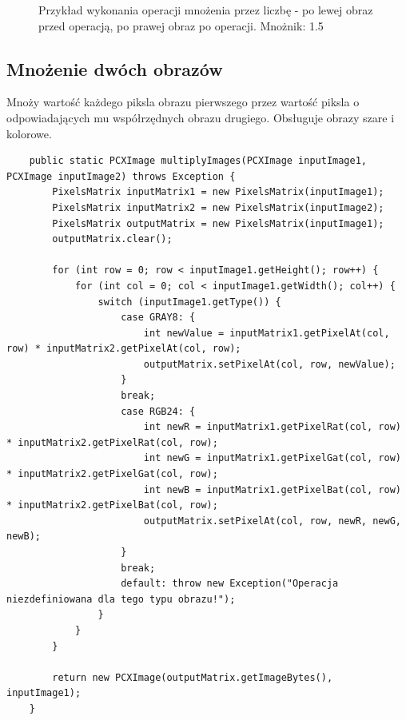 \documentclass{article}
\begin{document}
\begin{figure}[!ht]
	\caption{Przykład wykonania operacji mnożenia przez liczbę - po lewej obraz przed operacją, po prawej obraz po operacji. Mnożnik: 1.5 }
	\label{fig3}	
	\end{figure}
	
	\subsection{Mnożenie dwóch obrazów}
	Mnoży wartość każdego piksla obrazu pierwszego przez wartość piksla o odpowiadających mu współrzędnych obrazu drugiego. Obsługuje obrazy szare i kolorowe.
	
	\begin{verbatim}
	public static PCXImage multiplyImages(PCXImage inputImage1, PCXImage inputImage2) throws Exception {
        PixelsMatrix inputMatrix1 = new PixelsMatrix(inputImage1);
        PixelsMatrix inputMatrix2 = new PixelsMatrix(inputImage2);
        PixelsMatrix outputMatrix = new PixelsMatrix(inputImage1);
        outputMatrix.clear();

        for (int row = 0; row < inputImage1.getHeight(); row++) {
            for (int col = 0; col < inputImage1.getWidth(); col++) {
                switch (inputImage1.getType()) {
                    case GRAY8: {
                        int newValue = inputMatrix1.getPixelAt(col, row) * inputMatrix2.getPixelAt(col, row);
                        outputMatrix.setPixelAt(col, row, newValue);
                    }
                    break;
                    case RGB24: {
                        int newR = inputMatrix1.getPixelRat(col, row) * inputMatrix2.getPixelRat(col, row);
                        int newG = inputMatrix1.getPixelGat(col, row) * inputMatrix2.getPixelGat(col, row);
                        int newB = inputMatrix1.getPixelBat(col, row) * inputMatrix2.getPixelBat(col, row);
                        outputMatrix.setPixelAt(col, row, newR, newG, newB);
                    }
                    break;
                    default: throw new Exception("Operacja niezdefiniowana dla tego typu obrazu!");
                }
            }
        }

        return new PCXImage(outputMatrix.getImageBytes(), inputImage1);
    }
	\end{verbatim}
\end{document}
